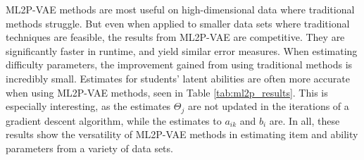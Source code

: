 ML2P-VAE methods are most useful on high-dimensional data where traditional methods struggle. But even when applied to smaller data sets where traditional techniques are feasible, the results from ML2P-VAE are competitive. They are significantly faster in runtime, and yield similar error measures. When estimating difficulty parameters, the improvement gained from using traditional methods is incredibly small. Estimates for students' latent abilities are often more accurate when using ML2P-VAE methods, seen in Table \ref{tab:ml2p_results}. This is especially interesting, as the estimates $\Theta_j$ are not updated in the iterations of a gradient descent algorithm, while the estimates to $a_{ik}$ and $b_i$ are. In all, these results show the versatility of ML2P-VAE methods in estimating item and ability parameters from a variety of data sets.

